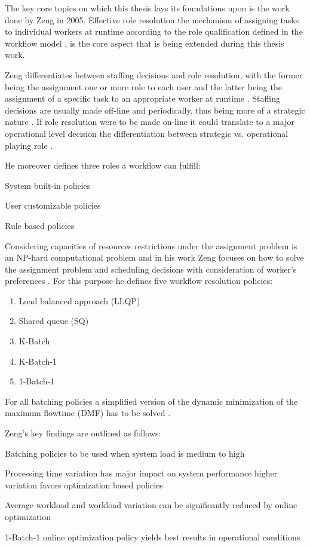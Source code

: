 \documentclass{seal_thesis}
\begin{document}
The key core topics on which this thesis lays its foundations upon is the work done by Zeng in 2005. Effective role resolution \ie the mechanism of assigning tasks to individual workers at runtime according to the role qualification defined in the workflow model \cite{Zeng2005}, is the core aspect that is being extended during this thesis work.

Zeng differentiates between staffing decisions and role resolution, with the former being the assignment one or more role to each user and the latter being the assignment of a specific task to an appropriate worker at runtime \cite{Zeng2005}. Staffing decisions are usually made off-line and periodically, thus being more of a strategic nature \cite{Zeng2005}. If role resolution were to be made on-line it could translate to a major operational level decision \ie the differentiation between strategic vs. operational playing role \cite{Zeng2005}.

He moreover defines three roles a workflow can fulfill:
\begin{enumerate*}
	\item System built-in policies
	\item User customizable policies
	\item Rule based policies
\end{enumerate*}

Considering capacities of resources restrictions under the assignment problem is an NP-hard computational problem and in his work Zeng focuses on how to solve the assignment problem and scheduling decisions with consideration of worker's preferences \cite{Zeng2005}. For this purpose he defines five workflow resolution policies:

\begin{enumerate}
	\item Load balanced approach (LLQP)
	\item Shared queue (SQ)
	\item K-Batch
	\item K-Batch-1
	\item 1-Batch-1
\end{enumerate}

For all batching policies a simplified version of the dynamic minimization of the maximum flowtime (DMF) has to be solved \cite{Zeng2005}.

Zeng's key findings are outlined as follows:
\begin{enumerate*}
	\item Batching policies to be used when system load is medium to high
	\item Processing time variation has major impact on system performance \ie higher variation favors optimization based policies
	\item Average workload and workload variation can be significantly reduced by online optimization
	\item 1-Batch-1 online optimization policy yields best results in operational conditions
\end{enumerate*}
\end{document}

